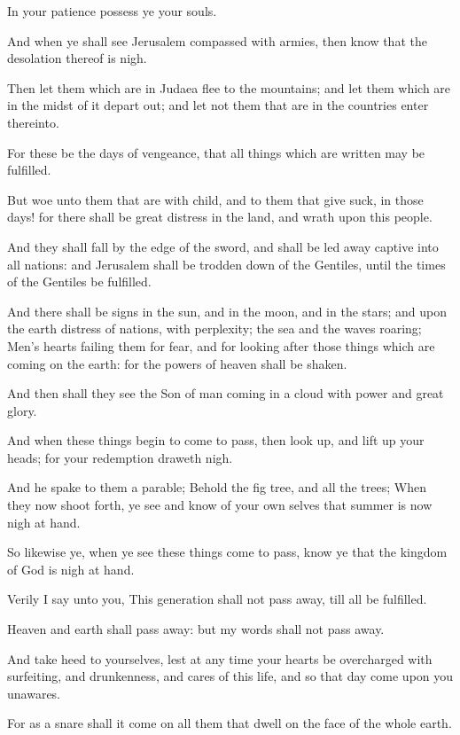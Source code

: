 \Verse In your patience possess ye your souls.

\Verse And when ye shall see Jerusalem compassed with armies, then know that the desolation thereof is nigh.

\Verse Then let them which are in Judaea flee to the mountains; and let them which are in the midst of it depart out; and let not them that are in the countries enter thereinto.

\Verse For these be the days of vengeance, that all things which are written may be fulfilled.

\Verse But woe unto them that are with child, and to them that give suck, in those days! for there shall be great distress in the land, and wrath upon this people.

\Verse And they shall fall by the edge of the sword, and shall be led away captive into all nations: and Jerusalem shall be trodden down of the Gentiles, until the times of the Gentiles be fulfilled.

\Verse And there shall be signs in the sun, and in the moon, and in the stars; and upon the earth distress of nations, with perplexity; the sea and the waves roaring; \Verse Men's hearts failing them for fear, and for looking after those things which are coming on the earth: for the powers of heaven shall be shaken.

\Verse And then shall they see the Son of man coming in a cloud with power and great glory.

\Verse And when these things begin to come to pass, then look up, and lift up your heads; for your redemption draweth nigh.

\Verse And he spake to them a parable; Behold the fig tree, and all the trees; \Verse When they now shoot forth, ye see and know of your own selves that summer is now nigh at hand.

\Verse So likewise ye, when ye see these things come to pass, know ye that the kingdom of God is nigh at hand.

\Verse Verily I say unto you, This generation shall not pass away, till all be fulfilled.

\Verse Heaven and earth shall pass away: but my words shall not pass away.

\Verse And take heed to yourselves, lest at any time your hearts be overcharged with surfeiting, and drunkenness, and cares of this life, and so that day come upon you unawares.

\Verse For as a snare shall it come on all them that dwell on the face of the whole earth.

